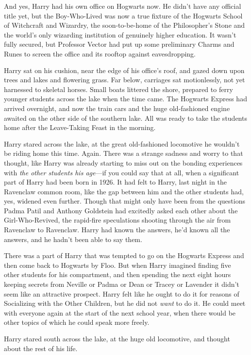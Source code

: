 And yes, Harry had his own office on Hogwarts now. He didn't have any official
title yet, but the Boy-Who-Lived was now a true fixture of the Hogwarts School
of Witchcraft and Wizardry, the soon-to-be-home of the Philosopher's Stone and
the world's only wizarding institution of genuinely higher education. It wasn't
fully secured, but Professor Vector had put up some preliminary Charms and
Runes to screen the office and its rooftop against eavesdropping.

Harry sat on his cushion, near the edge of his office's roof, and gazed down
upon trees and lakes and flowering grass. Far below, carriages sat
motionlessly, not yet harnessed to skeletal horses. Small boats littered the
shore, prepared to ferry younger students across the lake when the time came.
The Hogwarts Express had arrived overnight, and now the train cars and the huge
old-fashioned engine awaited on the other side of the southern lake. All was
ready to take the students home after the Leave-Taking Feast in the morning.

Harry stared across the lake, at the great old-fashioned locomotive he wouldn't
be riding home this time. Again. There was a strange sadness and worry to that
thought, like Harry was already starting to miss out on the bonding experiences
with \emph{the other students his age}—if you could say that at all, when a
significant part of Harry had been born in 1926. It had felt to Harry, last
night in the Ravenclaw common room, like the gap between him and the other
students had, yes, widened even further. Though that might only have been from
the questions Padma Patil and Anthony Goldstein had excitedly asked each other
about the Girl-Who-Revived, the rapid-fire speculations shooting through the
air from Ravenclaw to Ravenclaw. Harry had known the answers, he'd known all
the answers, and he hadn't been able to say them.

There was a part of Harry that was tempted to go on the Hogwarts Express and
then come back to Hogwarts by Floo. But when Harry imagined finding five other
students for his compartment, and then spending the next eight hours keeping
secrets from Neville or Padma or Dean or Tracey or Lavender{\el} it didn't
seem like an attractive prospect. Harry felt like he ought to do it for reasons
of Socializing with the Other Children, but he did not \emph{want} to do it. He
could meet with everyone again at the start of the next school year, when there
would be other topics of which he could speak more freely.

Harry stared south across the lake, at the huge old locomotive, and thought
about the rest of his life.

